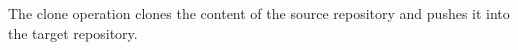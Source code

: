 \documentclass[../main.tex]{subfiles}
\begin{document}
The clone operation clones the content of the source repository and pushes it into the target repository.
\end{document}
